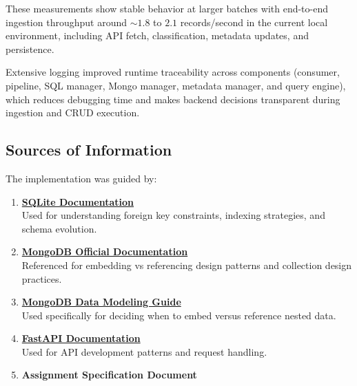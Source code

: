 \documentclass[12pt,a4paper]{article}
\begin{document}
These measurements show stable behavior at larger batches with end-to-end ingestion throughput around $\sim 1.8$ to $2.1$ records/second in the current local environment, including API fetch, classification, metadata updates, and persistence.

Extensive logging improved runtime traceability across components (consumer, pipeline, SQL manager, Mongo manager, metadata manager, and query engine), which reduces debugging time and makes backend decisions transparent during ingestion and CRUD execution.

\subsection{Sources of Information}
The implementation was guided by:

\begin{enumerate}[leftmargin=*]

  \item \textbf{\href{https://www.sqlite.org/docs.html}{SQLite Documentation}} \\
  Used for understanding foreign key constraints, indexing strategies, and schema evolution.

  \item \textbf{\href{https://www.mongodb.com/docs/}{MongoDB Official Documentation}} \\
  Referenced for embedding vs referencing design patterns and collection design practices.

  \item \textbf{\href{https://www.mongodb.com/docs/manual/core/data-modeling-introduction/}{MongoDB Data Modeling Guide}} \\
  Used specifically for deciding when to embed versus reference nested data.

  \item \textbf{\href{https://fastapi.tiangolo.com/}{FastAPI Documentation}} \\
  Used for API development patterns and request handling.


  \item \textbf{Assignment Specification Document}
\end{enumerate}
\end{document}
